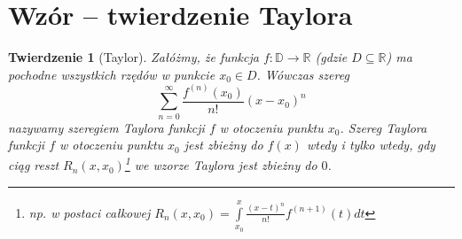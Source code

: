 \documentclass{article}
\newtheorem{tw}{Twierdzenie}[section]
\begin{document}
\section{Wzór -- twierdzenie Taylora}

\begin{tw}[Taylor]
    Załóżmy, że funkcja \(f : \mathbb{D} \to \mathbb{R}\)  (gdzie \(D \subseteq \mathbb{R}\)) ma pochodne wszystkich rzędów w punkcie \(x_0 \in D\). Wówczas szereg 
    \[
        \sum_{n=0}^{\infty} \frac{f^{\left(n\right)}(x_0)}{n!}(x-x_0)^n
    \]
    nazywamy szeregiem Taylora funkcji \(f\) w otoczeniu punktu \(x_0\). Szereg Taylora funkcji \(f\) w otoczeniu punktu \(x_0\) jest zbieżny do \(f(x)\) wtedy i tylko wtedy, gdy ciąg reszt \(R_n(x,x_0)\)\footnote{np. w postaci całkowej \(R_n(x,x_0) = \int\limits _{x_0}^x\frac{(x-t)^n}{n!}f^{(n+1)}(t)dt\)}
    we wzorze Taylora jest zbieżny do \(0\).
\end{tw}
\end{document}
